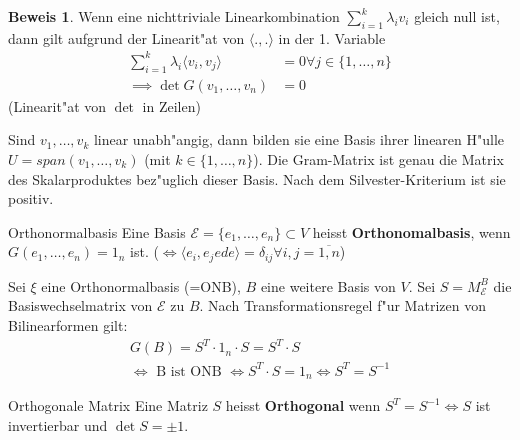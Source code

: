 \documentclass[oneside,fontsize=11pt,paper=a4,BCOR=0mm,DIV=12,automark,headsepline]{scrbook}
\theoremstyle{remark}
\theoremstyle{definition}
\theoremstyle{definition}
\newtheorem*{prof}{Beweis}
\theoremstyle{remark}
\begin{document}
\begin{prof}
  Wenn eine nichttriviale Linearkombination \(\sum_{i=1}^k \lambda_iv_i\) gleich null ist, dann gilt aufgrund der Linearit"at von \(\langle ., .\rangle\) in der 1. Variable \begin{align*}\sum_{i=1}^k \lambda_i\langle v_i, v_j\rangle &= 0 \forall j\in \{1, \dots, n\} \\ \implies \det G(v_1, \dots, v_n) &= 0\end{align*} (Linearit"at von \(\det\) in Zeilen)

  Sind \(v_1, \dots, v_k\) linear unabh"angig, dann bilden sie eine Basis ihrer linearen H"ulle \(U = span(v_1, \dots, v_k)\) (mit \(k \in \{1,\dots, n\}\)). Die Gram-Matrix ist genau die Matrix des Skalarproduktes bez"uglich dieser Basis. Nach dem Silvester-Kriterium ist sie positiv.
\end{prof}


\begin{definition}{Orthonormalbasis}{}
  Eine Basis $\mathcal{E} = \{e_1, \ldots, e_n\} \subset V$ heisst
  \textbf{Orthonomalbasis}, wenn $G(e_1, \ldots, e_n) = 1_n$ ist. ($\iff \langle
  {e_i, e_jede} \rangle = \delta_{ij} \forall i,j = \overline{1,n}$)
\end{definition}




\begin{relation}
  Sei $\xi$ eine Orthonormalbasis (=ONB), $B$ eine weitere Basis von $V$. Sei
  $S=M^B_\mathcal{E}$ die Basiswechselmatrix von $\mathcal{E}$ zu $B$. Nach
  Transformationsregel f"ur Matrizen von Bilinearformen gilt:
  \begin{align*}
    G(B) =  S^T\cdot 1_n \cdot S = S^T\cdot S\\
    \iff \text{ B ist ONB } \iff S^T\cdot S = 1_n \iff S^T = S^{-1}
  \end{align*}
\end{relation}

\begin{definition}{Orthogonale Matrix}
  Eine Matriz $S$ heisst \textbf{Orthogonal} wenn $S^T=S^{-1} \iff S$  ist
  invertierbar und $\det S = \pm 1$.
\end{definition}
\end{document}
